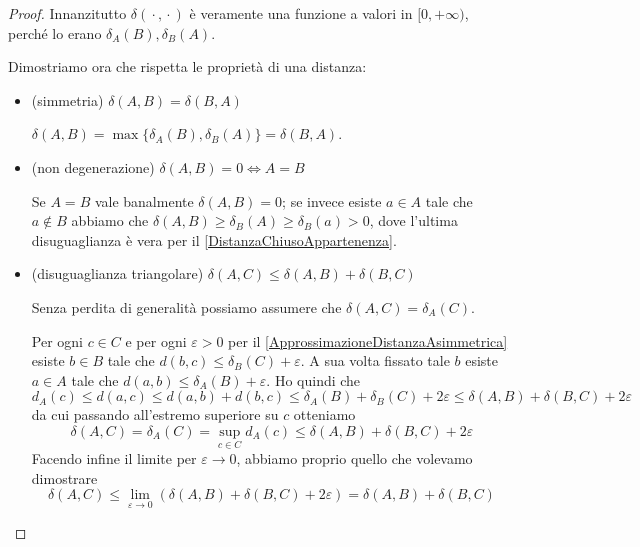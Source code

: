 \begin{proof}
	Innanzitutto $\delta({}\cdot{},{}\cdot{})$ è veramente una funzione a valori in $[0,+\infty)$, perché lo erano $\delta_A(B),\delta_B(A)$.

	Dimostriamo ora che rispetta le proprietà di una distanza:
	\begin{itemize}
		\item (simmetria) $\delta(A,B)=\delta(B,A)$
		
		$\delta(A,B)=\max\{ \delta_A(B),\delta_B(A) \}=\delta(B,A)$.
		\item (non degenerazione) $\delta(A,B)=0 \iff A=B$
		
		Se $A=B$ vale banalmente $\delta(A,B)=0$; se invece esiste $a\in A$ tale che $a\not\in B$ abbiamo che $\delta(A,B)\ge \delta_B(A)\ge \delta_B(a)>0$, dove l'ultima disuguaglianza è vera per il \cref{DistanzaChiusoAppartenenza}.
		\item (disuguaglianza triangolare) $\delta(A,C)\le \delta(A,B)+\delta(B,C)$

		Senza perdita di generalità possiamo assumere che $\delta(A,C)=\delta_A(C)$. 

		Per ogni $c\in C$ e per ogni $\varepsilon>0$ per il \cref{ApprossimazioneDistanzaAsimmetrica} esiste $b\in B$ tale che $d(b,c)\le \delta_B(C)+\varepsilon$. A sua volta fissato tale $b$ esiste $a\in A$ tale che $d(a,b)\le \delta_A(B)+\varepsilon$. Ho quindi che
		\begin{equation*}
			d_A(c)\le d(a,c)\le d(a,b)+d(b,c)\le \delta_A(B)+\delta_B(C)+2\varepsilon\le \delta(A,B)+\delta(B,C)+2\varepsilon
		\end{equation*}
		da cui passando all'estremo superiore su $c$ otteniamo
		\begin{equation*}
			\delta(A,C)=\delta_A(C)=\sup_{c\in C}d_A(c)\le \delta(A,B)+\delta(B,C)+2\varepsilon
		\end{equation*}
		Facendo infine il limite per $\varepsilon\to 0$, abbiamo proprio quello che volevamo dimostrare
		\begin{equation*}
			\delta(A,C)\le \lim_{\varepsilon\to 0}(\delta(A,B)+\delta(B,C)+2\varepsilon)=\delta(A,B)+\delta(B,C)
		\end{equation*}
	\end{itemize}
\end{proof}

